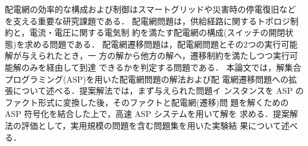配電網の効率的な構成および制御はスマートグリッドや災害時の停電復旧など
を支える重要な研究課題である．
%
配電網問題は，供給経路に関するトポロジ制約と，電流・電圧に関する電気制
約を満たす配電網の構成(スイッチの開閉状態)を求める問題である．
%
配電網遷移問題は，配電網問題とその2つの実行可能解が与えられたとき，一
方の解から他方の解へ，遷移制約を満たしつつ実行可能解のみを経由して到達
できるかを判定する問題である．
%
本論文では，解集合プログラミング(ASP)を用いた配電網問題の解法および配
電網遷移問題への拡張について述べる．提案解法では，まず与えられた問題イ
ンスタンスを ASP のファクト形式に変換した後，そのファクトと配電網(遷移)問
題を解くための ASP 符号化を結合した上で，高速 ASP システムを用いて解を
求める．提案解法の評価として，実用規模の問題を含む問題集を用いた実験結
果について述べる．


